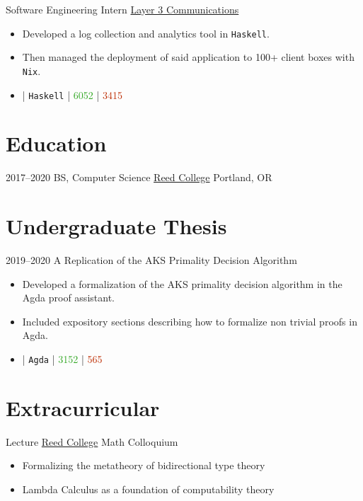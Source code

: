 \documentclass[10pt,letterpaper,sans]{moderncv}
\newcommand{\wlink}[2]{\textcolor[HTML]{0020B6}{\href{#1}{#2}}}
\newcommand{\lang}[1]{\texttt{#1}}
\newcommand{\ghlink}[2]{\wlink{https://github.com/#1}{#2}}
\newcommand{\ghrepo}[1]{\ghlink{#1}{\faGithub}}
\newcommand{\ghlang}[1]{\texttt{#1}}
\newcommand{\ghadd}[1]{\textcolor[HTML]{30A622}{{\faPlusCircle} #1}}
\newcommand{\ghrem}[1]{\textcolor[HTML]{BD2C00}{{\faMinusCircle} #1}}
\newcommand{\ghub}[4]{\ghrepo{#2} | \ghlang{#1} | \ghadd{#3} | \ghrem{#4}}
\begin{document}
        {Software Engineering Intern}
        {\wlink{http://layer3com.com/}{Layer 3 Communications}}
        {}{}
        {
\begin{itemize}
\item Developed a log collection and analytics tool in \lang{Haskell}.
\item Then managed the deployment of said application to 100+ client boxes with \lang{Nix}.
\item \ghub{Haskell}{layer-3-communications}{6052}{3415}
\end{itemize}
}

\section{Education}
\cventry
{2017--2020}
{BS, Computer Science}
{\wlink{https://reed.edu}{Reed College}}
{Portland, OR}
{}
{}

\section{Undergraduate Thesis}
\cventry
{2019--2020}
{A Replication of the AKS Primality Decision Algorithm}
{}
{}
{}
{
  \begin{itemize}         
  \item Developed a formalization of the AKS primality decision algorithm in the Agda proof assistant.
  \item Included expository sections describing how to formalize non trivial proofs in Agda.
  \item \ghub{Agda}{aljce/thesis}{3152}{565}
  \end{itemize}
}

\section{Extracurricular}
{Lecture}
{\wlink{http://reed.edu}{Reed College} Math Colloquium}
{}{}{
  \begin{itemize}
  \item Formalizing the metatheory of bidirectional type theory
  \item Lambda Calculus as a foundation of computability theory
  \end{itemize}
}
\end{document}
